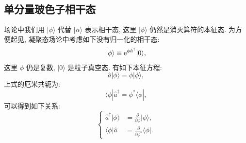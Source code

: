 \subsection{单分量玻色子相干态}
场论中我们用 $|\phi\rangle$ 代替 $|\alpha\rangle$ 表示相干态, 这里 $|\phi\rangle$ 仍然是消灭算符的本征态. 为方便起见, 凝聚态场论中考虑如下没有归一化的相干态:
\begin{equation}
|\phi\rangle\equiv\mathrm{e}^{\phi \hat{a}^{\dagger}}|0\rangle,
\end{equation}
这里 $\phi$ 仍是复数, $|0\rangle$ 是粒子真空态. 有如下本征方程:
\begin{equation}
\hat{a}|\phi\rangle=\phi|\phi\rangle,
\end{equation}
上式的厄米共轭为:
\begin{equation}
\langle\phi| \hat{a}^{\dagger}=\phi^{*}\langle\phi|,
\end{equation}
可以得到如下关系:
\begin{equation}
\left\{\begin{aligned}
\hat{a}^{\dagger}|\phi\rangle &=\frac{\partial}{\partial \phi}|\phi\rangle, \\
\langle\phi| \hat{a} &=\frac{\partial}{\partial \phi^{*}}\langle\phi| .
\end{aligned}\right.
\end{equation}

